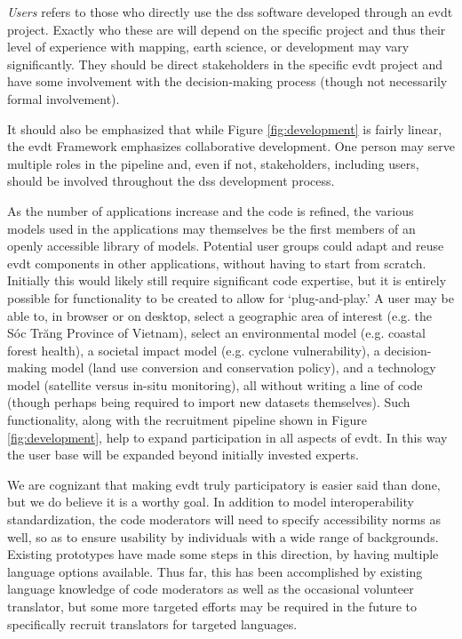 \textit{Users} refers to those who directly use the \ac{dss} software developed through an \ac{evdt} project. Exactly who these are will depend on the specific project and thus their level of experience with mapping, earth science, or development may vary significantly. They should be direct stakeholders in the specific \ac{evdt} project and have some involvement with the decision-making process (though not necessarily formal involvement). 

It should also be emphasized that while Figure \ref{fig:development} is fairly linear, the \ac{evdt} Framework emphasizes collaborative development. One person may serve multiple roles in the pipeline and, even if not, stakeholders, including users, should be involved throughout the \ac{dss} development process.

As the number of applications increase and the code is refined, the various models used in the applications may themselves be the first members of an openly accessible library of models. Potential user groups could adapt and reuse \ac{evdt} components in other applications, without having to start from scratch. Initially this would likely still require significant code expertise, but it is entirely possible for functionality to be created to allow for `plug-and-play.' A user may be able to, in browser or on desktop, select a geographic area of interest (e.g. the Sóc Trăng Province of Vietnam), select an environmental model (e.g. coastal forest health), a societal impact model (e.g. cyclone vulnerability), a decision-making model (land use conversion and conservation policy), and a technology model (satellite versus in-situ monitoring), all without writing a line of code (though perhaps being required to import new datasets themselves). Such functionality, along with the recruitment pipeline shown in Figure \ref{fig:development}, help to expand participation in all aspects of \ac{evdt}. In this way the user base will be expanded beyond initially invested experts.

We are cognizant that making \ac{evdt} truly participatory is easier said than done, but we do believe it is a worthy goal. In addition to model interoperability standardization, the code moderators will need to specify accessibility norms as well, so as to ensure usability by individuals with a wide range of backgrounds. Existing prototypes have made some steps in this direction, by having multiple language options available. Thus far, this has been accomplished by existing language knowledge of code moderators as well as the occasional volunteer translator, but some more targeted efforts may be required in the future to specifically recruit translators for targeted languages.

